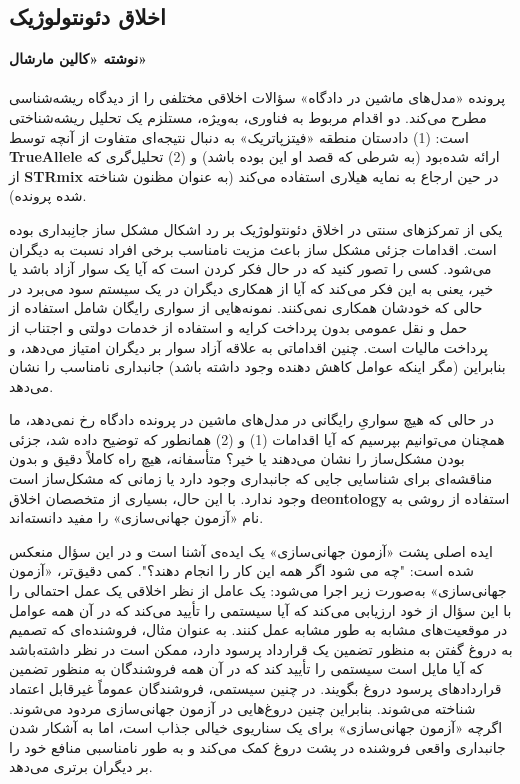{
\subsection*{اخلاق دئونتولوژیک}
\label{subsec:اخلاق دئونتولوژیک}
\textbf{نوشته «کالین مارشال»}
\\\\
پرونده «مدل‌های ماشین در دادگاه» سؤالات اخلاقی مختلفی را از دیدگاه ریشه‌شناسی مطرح می‌کند.
دو اقدام مربوط به فناوری، به‌ویژه، مستلزم یک تحلیل ریشه‌شناختی است: (1) دادستان منطقه «فیتزپاتریک» به دنبال نتیجه‌ای متفاوت از آنچه توسط \textenglish{\textbf{TrueAllele}} ارائه شده‌بود (به شرطی که قصد او این بوده باشد) و (2) تحلیل‌گری که از \textenglish{\textbf{STRmix}} در حین ارجاع به نمایه هیلاری استفاده می‌کند (به عنوان مظنون شناخته شده پرونده).
}

یکی از تمرکزهای سنتی در اخلاق دئونتولوژیک بر رد اشکال مشکل ساز جانِبداری بوده است.
اقدامات جزئی مشکل ساز باعث مزیت نامناسب برخی افراد نسبت به دیگران می‌شود.
کسی را تصور کنید که در حال فکر کردن است که آیا یک سوار آزاد باشد یا خیر، یعنی به این فکر می‌کند که آیا از همکاری دیگران در یک سیستم سود می‌برد در حالی که خودشان همکاری نمی‌کنند.
نمونه‌هایی از سواری رایگان شامل استفاده از حمل و نقل عمومی بدون پرداخت کرایه و استفاده از خدمات دولتی و اجتناب از پرداخت مالیات است.
چنین اقداماتی به علاقه آزاد سوار بر دیگران امتیاز می‌دهد، و بنابراین (مگر اینکه عوامل کاهش دهنده وجود داشته باشد) جانبداری نامناسب را نشان می‌دهد.

در حالی که هیچ سواریِ رایگانی در مدل‌های ماشین در پرونده دادگاه رخ نمی‌دهد، ما همچنان می‌توانیم بپرسیم که آیا اقدامات (1) و (2) همانطور که توضیح داده شد، جزئی بودن مشکل‌ساز را نشان می‌دهند یا خیر؟ متأسفانه، هیچ راه کاملاً دقیق و بدون مناقشه‌ای برای شناسایی جایی که جانبداری وجود دارد یا زمانی که مشکل‌ساز است وجود ندارد.
با این حال، بسیاری از متخصصان اخلاق \textenglish{\textbf{deontology}} استفاده از روشی به نام «آزمون جهانی‌سازی» را مفید دانسته‌اند.

ایده اصلی پشت «آزمون جهانی‌سازی» یک ایده‌ی آشنا است و در این سؤال منعکس شده است: "چه می شود اگر همه این کار را انجام دهند؟".
کمی دقیق‌تر، «آزمون جهانی‌سازی» به‌صورت زیر اجرا می‌شود: یک عامل از نظر اخلاقی یک عمل احتمالی را با این سؤال از خود ارزیابی می‌کند که آیا سیستمی را تأیید می‌کند که در آن همه عوامل در موقعیت‌های مشابه به طور مشابه عمل کنند.
به عنوان مثال، فروشنده‌ای که تصمیم به دروغ گفتن به منظور تضمین یک قرارداد پرسود دارد، ممکن است در نظر داشته‌باشد که آیا مایل است سیستمی را تأیید کند که در آن همه فروشندگان به منظور تضمین قراردادهای پرسود دروغ بگویند.
در چنین سیستمی، فروشندگان عموماً غیرقابل اعتماد شناخته می‌شوند.
بنابراین چنین دروغ‌هایی در آزمون جهانی‌سازی مردود می‌شوند.
اگرچه «آزمون جهانی‌سازی» برای یک سناریوی خیالی جذاب است، اما به آشکار شدن جانبداری واقعی فروشنده در پشت دروغ کمک می‌کند و به طور نامناسبی منافع خود را بر دیگران برتری می‌دهد.

